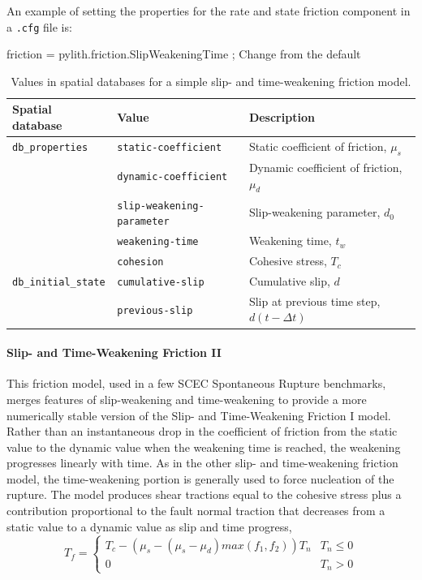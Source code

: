 An example of setting the properties for the rate and state friction
component in a \texttt{.cfg} file is:
\begin{lyxcode}

friction = pylith.friction.SlipWeakeningTime ; Change from the default
\end{lyxcode}

\begin{table}[htbp]
\caption{Values in spatial databases for a simple slip- and time-weakening friction model.}
\label{tab:slip:time:weakening:properties:statevars}
\begin{tabular}{llp{2.5in}}
\textbf{Spatial database} & \textbf{Value} & \textbf{Description}\\
\hline 
\texttt{db\_properties} & \texttt{static-coefficient} & Static coefficient of friction, $\mu_{s}$\\
 & \texttt{dynamic-coefficient} & Dynamic coefficient of friction, $\mu_{d}$\\
 & \texttt{slip-weakening-parameter} & Slip-weakening parameter, $d_{0}$\\
 & \texttt{weakening-time} & Weakening time, $t_{w}$\\
 & \texttt{cohesion} & Cohesive stress, $T_{c}$\\
\hline 
\texttt{db\_initial\_state} & \texttt{cumulative-slip} & Cumulative slip, $d$\\
 & \texttt{previous-slip} & Slip at previous time step, $d(t-\Delta t)$\\
\hline 
\end{tabular}
\end{table}


\paragraph{Slip- and Time-Weakening Friction II}
\label{sec:friction:slip:time:stable:weakening}

This friction model, used in a few SCEC Spontaneous Rupture benchmarks,
merges features of slip-weakening and time-weakening to provide a
more numerically stable version of the Slip- and Time-Weakening Friction
I model. Rather than an instantaneous drop in the coefficient of friction
from the static value to the dynamic value when the weakening time
is reached, the weakening progresses linearly with time. As in the
other slip- and time-weakening friction model, the time-weakening
portion is generally used to force nucleation of the rupture. The
model produces shear tractions equal to the cohesive stress plus a
contribution proportional to the fault normal traction that decreases
from a static value to a dynamic value as slip and time progress,
\begin{equation}
T_{f}=\begin{cases}
T_{c}-(\mu_{s}-(\mu_{s}-\mu_{d})max(f_{1},f_{2}))T_{n} & T_{n}\leq0\\
0 & T_{n}>0
\end{cases}
\end{equation}


